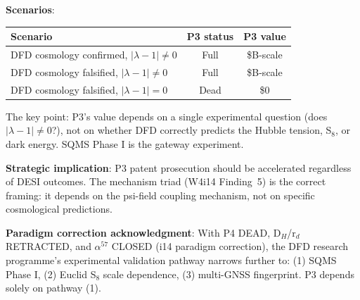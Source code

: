 \documentclass[11pt]{article}
\theoremstyle{definition}
\theoremstyle{remark}
\newcommand{\lamdiff}{|\lambda-1|}
\begin{document}
\begin{tcolorbox}[colback=blue!5!white, colframe=blue!60!black,
  title=\textbf{W4i15 TOP 5 FINDINGS --- READ FIRST}]
\begin{enumerate}[nosep]
  \textbf{Scenarios}:
  \begin{center}
  \begin{tabular}{@{}lcc@{}}
  \toprule
  Scenario & P3 status & P3 value \\
  \midrule
  DFD cosmology confirmed, $\lamdiff \neq 0$ & Full & \$B-scale \\
  DFD cosmology falsified, $\lamdiff \neq 0$ & Full & \$B-scale \\
  DFD cosmology falsified, $\lamdiff = 0$ & Dead & \$0 \\
  \bottomrule
  \end{tabular}
  \end{center}

  The key point: P3's value depends on a single experimental question
  (does $\lamdiff \neq 0$?), not on whether DFD correctly predicts
  the Hubble tension, S$_8$, or dark energy.  SQMS Phase I is the
  gateway experiment.

  \textbf{Strategic implication}: P3 patent prosecution should be
  accelerated regardless of DESI outcomes.  The mechanism triad
  (W4i14 Finding~5) is the correct framing: it depends on the
  psi-field coupling mechanism, not on specific cosmological
  predictions.

  \textbf{Paradigm correction acknowledgment}: With P4 DEAD,
  D$_H$/r$_d$ RETRACTED, and $\alpha^{57}$ CLOSED (i14 paradigm
  correction), the DFD research programme's experimental
  validation pathway narrows further to: (1) SQMS Phase I,
  (2) Euclid S$_8$ scale dependence, (3) multi-GNSS fingerprint.
  P3 depends solely on pathway (1).

\end{enumerate}
\end{tcolorbox}
\end{document}
